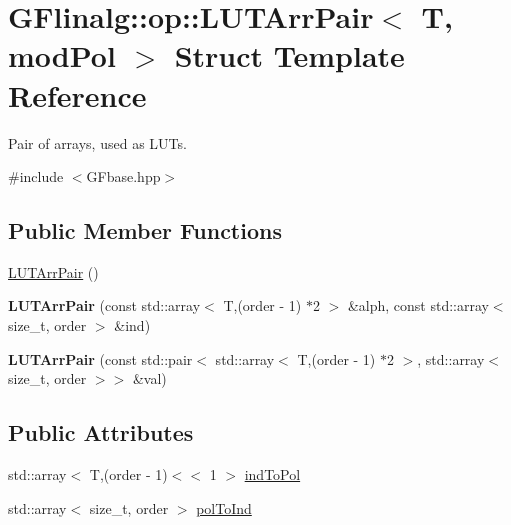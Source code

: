 \hypertarget{struct_g_flinalg_1_1op_1_1_l_u_t_arr_pair}{}\section{G\+Flinalg\+::op\+::L\+U\+T\+Arr\+Pair$<$ T, mod\+Pol $>$ Struct Template Reference}
\label{struct_g_flinalg_1_1op_1_1_l_u_t_arr_pair}


Pair of arrays, used as L\+U\+Ts.  




{\ttfamily \#include $<$G\+Fbase.\+hpp$>$}

\subsection*{Public Member Functions}
\begin{DoxyCompactItemize}
\item 
\mbox{\hyperlink{struct_g_flinalg_1_1op_1_1_l_u_t_arr_pair_a639ced221b57026c7d9881c86d219ea5}{L\+U\+T\+Arr\+Pair}} ()
\item 
\mbox{\label{struct_g_flinalg_1_1op_1_1_l_u_t_arr_pair_a090a30ba2494eefdd75030ee7f26c6a8}} 
{\bfseries L\+U\+T\+Arr\+Pair} (const std\+::array$<$ T,(order -\/ 1) $\ast$2 $>$ \&alph, const std\+::array$<$ size\+\_\+t, order $>$ \&ind)
\item 
\mbox{\label{struct_g_flinalg_1_1op_1_1_l_u_t_arr_pair_a590037bde147d7a7bcef32fcfec58d9d}} 
{\bfseries L\+U\+T\+Arr\+Pair} (const std\+::pair$<$ std\+::array$<$ T,(order -\/ 1) $\ast$2 $>$, std\+::array$<$ size\+\_\+t, order $>$$>$ \&val)
\end{DoxyCompactItemize}
\subsection*{Public Attributes}
\begin{DoxyCompactItemize}
\item 
std\+::array$<$ T,(order -\/ 1)$<$$<$ 1 $>$ \mbox{\hyperlink{struct_g_flinalg_1_1op_1_1_l_u_t_arr_pair_a02a58d258f3ddfea418c6ce342bc0dc0}{ind\+To\+Pol}}
\item 
std\+::array$<$ size\+\_\+t, order $>$ \mbox{\hyperlink{struct_g_flinalg_1_1op_1_1_l_u_t_arr_pair_a4239b75efb0f73c38a44d16246ee980d}{pol\+To\+Ind}}
\end{DoxyCompactItemize}
